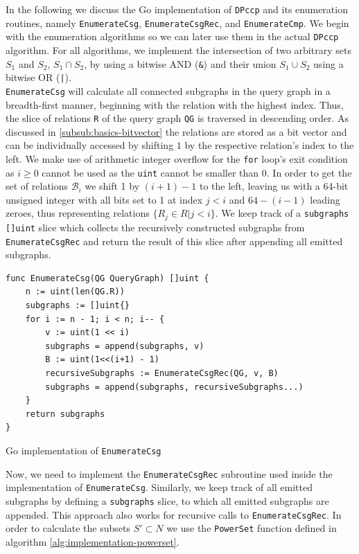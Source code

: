 In the following we discuss the Go implementation of \texttt{DPccp} and its enumeration routines, namely \texttt{EnumerateCsg}, \texttt{EnumerateCsgRec}, and \texttt{EnumerateCmp}. We begin with the enumeration algorithms so we can later use them in the actual \texttt{DPccp} algorithm.
For all algorithms, we implement the intersection of two arbitrary sets $S_1$ and $S_2$, $S_1 \cap S_2$, by using a bitwise AND (\texttt{\&}) and their union $S_1 \cup S_2$ using a bitwise OR (\texttt{|}).\\

\texttt{EnumerateCsg} will calculate all connected subgraphs in the query graph in a breadth-first manner, beginning with the relation with the highest index. Thus, the slice of relations \texttt{R} of the query graph \texttt{QG} is traversed in descending order. As discussed in \ref{subsub:basics-bitvector} the relations are stored as a bit vector and can be individually accessed by shifting $1$ by the respective relation's index to the left. We make use of arithmetic integer overflow for the \texttt{for} loop's exit condition as $i \geq 0$ cannot be used as the \texttt{uint} cannot be smaller than 0. In order to get the set of relations $\mathcal{B}_i$ we shift 1 by $(i+1) - 1$ to the left, leaving us with a 64-bit unsigned integer with all bits set to 1 at index $j < i$ and $64 - (i-1)$ leading zeroes, thus representing relations $\{R_{j} \in R \vert j < i\}$. We keep track of a \texttt{subgraphs} \texttt{[]uint} slice which collects the recursively constructed subgraphs from \texttt{EnumerateCsgRec} and return the result of this slice after appending all emitted subgraphs.
\vspace{0.4cm}

\begin{algorithm}[H]
\begin{verbatim}
func EnumerateCsg(QG QueryGraph) []uint {
    n := uint(len(QG.R))
    subgraphs := []uint{}
    for i := n - 1; i < n; i-- {
        v := uint(1 << i)
        subgraphs = append(subgraphs, v)
        B := uint(1<<(i+1) - 1)
        recursiveSubgraphs := EnumerateCsgRec(QG, v, B)
        subgraphs = append(subgraphs, recursiveSubgraphs...)
    }
    return subgraphs
}
\end{verbatim}
\caption{Go implementation of \texttt{EnumerateCsg}}
\label{alg:enumeratecsg}
\end{algorithm}
\vspace{0.8cm}

Now, we need to implement the \texttt{EnumerateCsgRec} subroutine used inside the implementation of \texttt{EnumerateCsg}. Similarly, we keep track of all emitted subgraphs by defining a \texttt{subgraphs} slice, to which all emitted subgraphs are appended. This approach also works for recursive calls to \texttt{EnumerateCsgRec}. In order to calculate the subsets $S' \subset N$ we use the \texttt{PowerSet} function defined in algorithm \ref{alg:implementation-powerset}.

